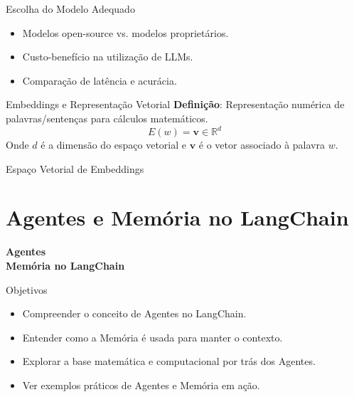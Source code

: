 \documentclass{beamer}
\begin{document}
\begin{frame}{Escolha do Modelo Adequado}
    \begin{itemize}
        \item Modelos open-source vs. modelos proprietários.
        \item Custo-benefício na utilização de LLMs.
        \item Comparação de latência e acurácia.
    \end{itemize}
\end{frame}

\begin{frame}{Embeddings e Representação Vetorial}
    \textbf{Definição}: Representação numérica de palavras/sentenças para cálculos matemáticos.
    \begin{equation}
        E(w) = \mathbf{v} \in \mathbb{R}^d
    \end{equation}
    Onde $d$ é a dimensão do espaço vetorial e $\mathbf{v}$ é o vetor associado à palavra $w$.
\end{frame}
\begin{frame}{Espaço Vetorial de Embeddings}
    \begin{center}
    \end{center}
\end{frame}
\section{Agentes e Memória no LangChain}
\begin{frame}
\centering
\Huge
\textbf{Agentes\\Memória no LangChain}
\end{frame}
\begin{frame}{Objetivos}
\begin{itemize}
    \item Compreender o conceito de Agentes no LangChain.
    \item Entender como a Memória é usada para manter o contexto.
    \item Explorar a base matemática e computacional por trás dos Agentes.
    \item Ver exemplos práticos de Agentes e Memória em ação.
\end{itemize}
\end{frame}
\end{document}
